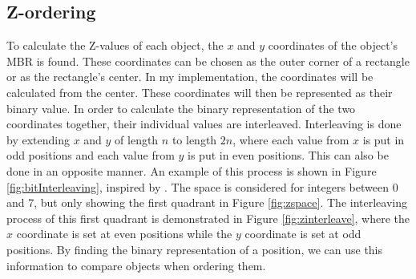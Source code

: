 \subsection{Z-ordering}
\label{sect:zordering}
To calculate the Z-values of each object, the $x$ and $y$ coordinates of the object's MBR is found. These coordinates can be chosen as the outer corner of a rectangle or as the rectangle's center. In my implementation, the coordinates will be calculated from the center. These coordinates will then be represented as their binary value. In order to calculate the binary representation of the two coordinates together, their individual values are interleaved. Interleaving is done by extending $x$ and $y$ of length $n$ to length $2n$, where each value from $x$ is put in odd positions and each value from $y$ is put in even positions\cite{interleave}. This can also be done in an opposite manner. An example of this process is shown in Figure \ref{fig:bitInterleaving}, inspired by \cite{zorder_figure}. The space is considered for integers between 0 and 7, but only showing the first quadrant in Figure \ref{fig:zspace}. The interleaving process of this first quadrant is demonstrated in Figure \ref{fig:zinterleave}, where the $x$ coordinate is set at even positions while the $y$ coordinate is set at odd positions. By finding the binary representation of a position, we can use this information to compare objects when ordering them. 

